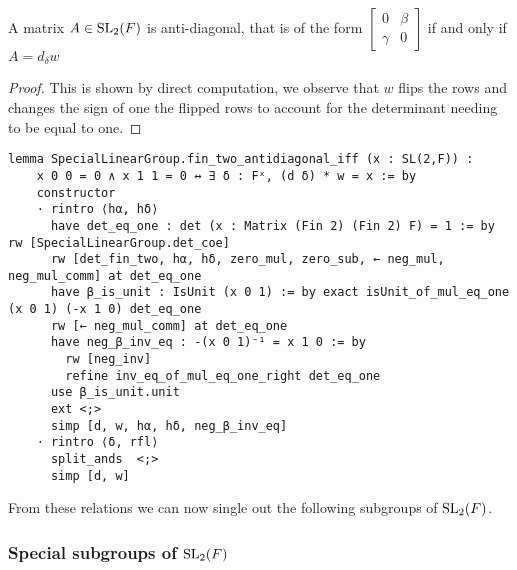 \begin{corollary}
    \label{SpecialLinearGroup.fin_two_antidiagonal_iff}
    \leanok
    A matrix $A \in \operatorname{SL}_2(F)$ is anti-diagonal, that is of the form $\begin{bmatrix}
        0 & \beta\\
        \gamma & 0
    \end{bmatrix}$ if and only if $A = d_\delta w$
\end{corollary}
\begin{proof}
\leanok
This is shown by direct computation, we observe that $w$ flips the rows and changes the sign of one the flipped rows to account for the determinant needing to be equal to one.
\end{proof}
\begin{footnotesize}
\begin{verbatim}
lemma SpecialLinearGroup.fin_two_antidiagonal_iff (x : SL(2,F)) :
    x 0 0 = 0 ∧ x 1 1 = 0 ↔ ∃ δ : Fˣ, (d δ) * w = x := by
    constructor
    · rintro ⟨hα, hδ⟩
      have det_eq_one : det (x : Matrix (Fin 2) (Fin 2) F) = 1 := by rw [SpecialLinearGroup.det_coe]
      rw [det_fin_two, hα, hδ, zero_mul, zero_sub, ← neg_mul, neg_mul_comm] at det_eq_one
      have β_is_unit : IsUnit (x 0 1) := by exact isUnit_of_mul_eq_one (x 0 1) (-x 1 0) det_eq_one
      rw [← neg_mul_comm] at det_eq_one
      have neg_β_inv_eq : -(x 0 1)⁻¹ = x 1 0 := by
        rw [neg_inv]
        refine inv_eq_of_mul_eq_one_right det_eq_one
      use β_is_unit.unit
      ext <;>
      simp [d, w, hα, hδ, neg_β_inv_eq]
    · rintro ⟨δ, rfl⟩
      split_ands  <;>
      simp [d, w]
\end{verbatim}
\end{footnotesize}

From these relations we can now single out the following subgroups of $\operatorname{SL}_2(F)$.

\subsubsection{Special subgroups of $\operatorname{SL}_2(F)$}

